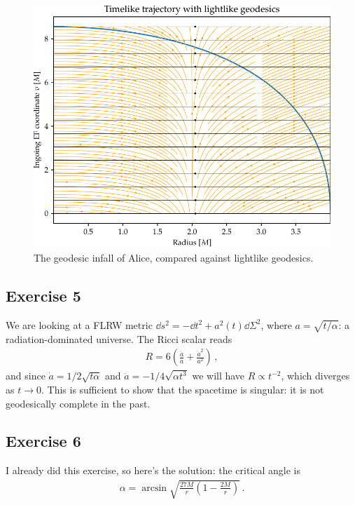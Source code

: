 \documentclass[main.tex]{subfiles}
\begin{document}
\begin{figure}[ht]
\centering
\includegraphics[width=\textwidth]{figures/spacetime_ef}
\caption{The geodesic infall of Alice, compared against lightlike geodesics.}
\label{fig:spacetime_ef}
\end{figure}

\subsection{Exercise 5}

We are looking at a FLRW metric \(\dd{s^2} = - \dd{t^2} + a^2(t) \dd{\Sigma^2}\), where \(a = \sqrt{ t / \alpha }\): a radiation-dominated universe. 
The Ricci scalar reads %
\begin{align}
R = 6 \left( \frac{\ddot{a}}{a} + \frac{\dot{a}^2}{a^2}\right)
\,,
\end{align}
%
and since \(\dot{a} = 1 / 2 \sqrt{t \alpha }\) and \(\ddot{a} = - 1 / 4 \sqrt{\alpha t^3}\) we will have \(R \propto t^{-2}\), which diverges as \(t \to 0\). This is sufficient to show that the spacetime is singular: it is not geodesically complete in the past.

\subsection{Exercise 6}

I already did this exercise, so here's the solution: the critical angle is 
%
\begin{align}
\alpha = \arcsin \sqrt{\frac{27M}{r} \left(1 - \frac{2M}{r}\right)}
\,.
\end{align}
\end{document}
